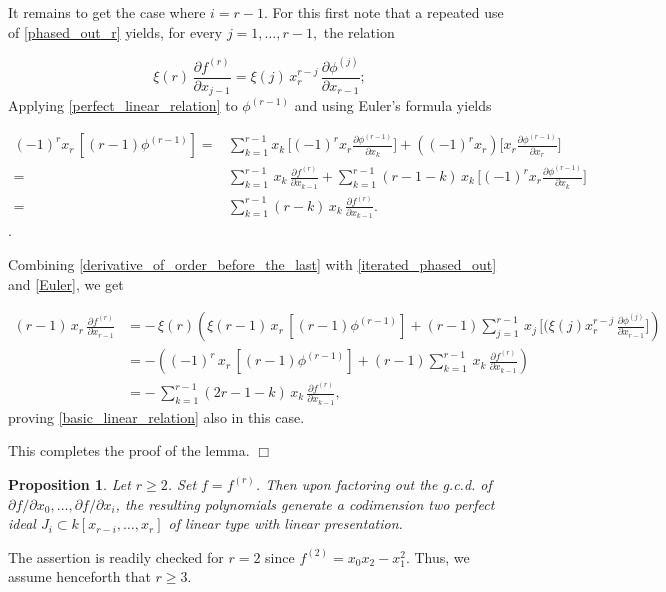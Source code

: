 \documentclass[11pt]{article}   %
\newtheorem{Proposition}[Theorem]{Proposition}
\theoremstyle{definition}
\numberwithin{Theorem}{section} \numberwithin{equation}{section}
\def\demo{\noindent{\it Proof. }}
\def\QED{\hfill$\Box$}
\def\qed{\QED}
\begin{document}
{It remains to get the case where $i=r-1$. For this first note that a
repeated use of \eqref{phased_out_r} yields, for every $j=1,\ldots,
r-1,$ the relation

\begin{equation}\label{iterated_phased_out}
\xi(r)\, \frac{\partial f^{(r)}}{\partial x_{j-1}}= \xi(j)\,
x_r^{r-j}\,\frac{\partial \phi^{(j)}}{\partial x_{r-1}};
\end{equation}
Applying \eqref{perfect_linear_relation} to $\phi^{(r-1)}$
and using Euler's formula yields

\begin{align}\label{Euler}\nonumber
(-1)^rx_r\, [(r-1)\phi^{(r-1)}]=&\sum_{k=1}^{r-1}x_k\,
\biggl[(-1)^rx_r\frac{\partial \phi^{(r-1)}}{\partial
x_k}\biggr]+((-1)^rx_r) \biggl[x_r\frac{\partial \phi^{(r-1)}}{\partial
x_r}\biggr]\\ \nonumber =&\sum_{k=1}^{r-1}\,x_k\,\frac{\partial
f^{(r)}}{\partial
x_{k-1}}+\sum_{k=1}^{r-1}(r-1-k)\,x_k\,\biggl[(-1)^rx_r
\frac{\partial \phi^{(r-1)}}{\partial x_k}\biggr]\\
=&\sum_{k=1}^{r-1}(r-k)\,x_k\,\frac{\partial f^{(r)}}{\partial
x_{k-1}}.
\end{align}.

Combining \eqref {derivative_of_order_before_the_last} with \eqref{iterated_phased_out} and \eqref{Euler},  we get

\begin{align*}\label{relation_of_order_last} (r-1)\,x_r\,
\frac{\partial f^{(r)}}{\partial x_{r-1}}&
=-\,\xi(r)\left(\xi(r-1)\,x_r\,[(r-1)\phi^{(r-1)}]+(r-1)\sum_{j=1}^{r-1}
\,x_j\, \biggl[(\xi(j)x_r^{r-j}\,\frac{\partial \phi^{(j)}}{\partial
x_{r-1}}\biggr]\right)\\ \nonumber
&=-\left((-1)^r\,x_r\,[(r-1)\phi^{(r-1)}]+(r-1)\sum_{k=1}^{r-1}\,x_k\,\frac{\partial
f^{(r)}}{\partial x_{k-1}}\right)\\ \nonumber
&=-\,\sum_{k=1}^{r-1}(2r-1-k)\,x_k\,\frac{\partial f^{(r)}}{\partial
x_{k-1}},
\end{align*}
proving  \eqref{basic_linear_relation} also in this case.

This completes the proof of the lemma. \qed


\begin{Proposition}\label{perfection}
Let  $r\geq 2$.  Set $f=f^ {(r)}$. Then upon factoring out the
g.c.d. of $\partial f/\partial x_0,\ldots,\partial f/\partial x_{i}$,
the resulting polynomials generate a codimension two perfect ideal
$J_i\subset k[x_{r-i},\ldots,x_{r}]$ of linear type with linear
presentation.
\end{Proposition}
\demo  The assertion is readily checked for $r=2$ since
$f^{(2)}=x_0x_2-x_1^2$. Thus, we assume henceforth that $r\geq 3$.

}
\end{document}
